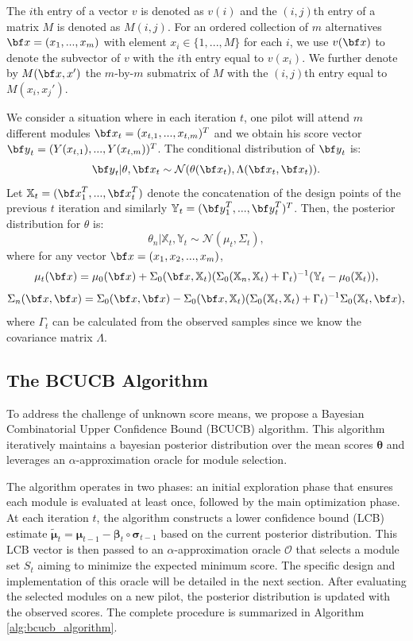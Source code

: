 \documentclass[opre,sglanonrev]{informs4}
\begin{document}
The $i$th entry of a vector $v$ is denoted as $v(i)$ and the $(i,j)$th entry of a matrix $M$ is denoted as $M(i,j)$. For an ordered collection of $m$ alternatives ${\bf x}=(x_1,...,x_m)$ with element $x_i \in \{1,...,M\}$ for each $i$, we use $v(\bf x)$ to denote the subvector of $v$ with the $i$th entry equal to $v(x_i)$. We further denote by $M(\bf x, x')$ the $m$-by-$m$ submatrix of $M$ with the $(i,j)$th entry equal to $M(x_i, x_j')$.  

We consider a situation where in each iteration $t$, one pilot will attend $m$ different modules ${\bf x}_t = (x_{t,1},...,x_{t,m})^T$ and we obtain his score vector ${\bf y}_t = (Y(x_{t,1}),...,Y(x_{t,m}))^T$. The conditional distribution of ${\bf y}_t$ is:
$${\bf y}_t | \theta,{\bf x}_t \sim \mathcal{N}(\theta({\bf x}_t), \Lambda({\bf x}_t,{\bf x}_t)). $$ 
Let $\mathbb{X}_t = ({\bf x}_1^T,...,{\bf x}_t^T )$ denote the concatenation of the design points of the previous $t$ iteration and similarly $\mathbb{Y}_t =({\bf y}_1^T,...,{\bf y}_t^T )^T$. Then, the posterior distribution for $\theta$ is:
$$\theta_n|\mathbb{X}_t,\mathbb{Y}_t  \sim \mathcal{N}(\mu_t, \Sigma_t),$$
where for any vector ${\bf x} = (x_1, x_2,...,x_m)$,
$$
	\mu_t({\bf x}) = \mu_0({\bf x}) + \Sigma_0(\bf x, \mathbb{X}_t)(\Sigma_0(\mathbb{X}_n,\mathbb{X}_t) + \Gamma_t)^{-1}(\mathbb{Y}_t-\mu_0(\mathbb{X}_t)),
$$
$$
	\Sigma_n({\bf x},{\bf x}) = \Sigma_0({\bf x},{\bf x}) - \Sigma_0(\bf x, \mathbb{X}_t)(\Sigma_0(\mathbb{X}_t,\mathbb{X}_t) + \Gamma_t)^{-1}\Sigma_0(\mathbb{X}_t, \bf x),
$$
where $\Gamma_t$ can be calculated from the observed samples since we know the covariance matrix $\Lambda$.

\subsection{The BCUCB Algorithm} 
To address the challenge of unknown score means, we propose a Bayesian Combinatorial Upper Confidence Bound (BCUCB) algorithm. This algorithm iteratively maintains a bayesian posterior distribution over the mean scores $\boldsymbol{\theta}$ and leverages an $\alpha$-approximation oracle for module selection.

The algorithm operates in two phases: an initial exploration phase that ensures each module is evaluated at least once, followed by the main optimization phase. At each iteration $t$, the algorithm constructs a lower confidence bound (LCB) estimate $\boldsymbol{\tilde{\mu}}_t = \boldsymbol{\mu}_{t-1} - \boldsymbol{\beta}_t \circ \boldsymbol{\sigma}_{t-1}$ based on the current posterior distribution. This LCB vector is then passed to an $\alpha$-approximation oracle $\mathcal{O}$ that selects a module set $S_t$ aiming to minimize the expected minimum score. The specific design and implementation of this oracle will be detailed in the next section. After evaluating the selected modules on a new pilot, the posterior distribution is updated with the observed scores. The complete procedure is summarized in Algorithm \ref{alg:bcucb_algorithm}.
\end{document}

